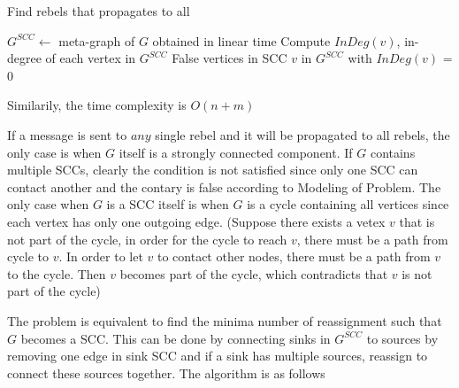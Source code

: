\documentclass[12pt,a4paper]{article}
\newcommand{\question}[1]{\bigskip\noindent{\textbf{Q{#1} solution}}}
\begin{document}
\begin{algorithm}
\caption{Find rebels that propagates to all}\label{alg:q24A}
\begin{algorithmic}
    \State $G^{SCC} \gets$ meta-graph of $G$ obtained in linear time
    \State Compute $InDeg(v)$, in-degree of each vertex in $G^{SCC}$
      \State \Return False
    \Else
      \State \Return vertices in SCC $v$ in $G^{SCC}$ with $InDeg(v)$ = 0
    \EndIf
  \EndFunction
\end{algorithmic}
\end{algorithm}

Similarily, the time complexity is $O(n + m)$

\question{24.D}

If a message is sent to $any$ single rebel and it will be propagated to all rebels, the only case is when $G$ itself is a strongly connected component. If $G$ contains multiple SCCs, clearly the condition is not satisfied since only one SCC can contact another and the contary is false according to Modeling of Problem. The only case when $G$ is a SCC itself is when $G$ is a cycle containing all vertices since each vertex has only one outgoing edge. (Suppose there exists a vetex $v$ that is not part of the cycle, in order for the cycle to reach $v$, there must be a path from cycle to $v$. In order to let $v$ to contact other nodes, there must be a path from $v$ to the cycle. Then $v$ becomes part of the cycle, which contradicts that $v$ is not part of the cycle)

The problem is equivalent to find the minima number of reassignment such that $G$ becomes a SCC. This can be done by connecting sinks in $G^{SCC}$ to sources by removing one edge in sink SCC and if a sink has multiple sources, reassign to connect these sources together. The algorithm is as follows
\end{document}
